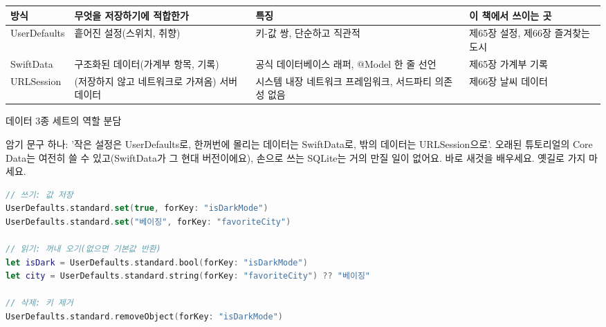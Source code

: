 


\begin{center}
\begin{tabularx}{\linewidth}{|X|X|X|X|}
\hline
\textbf{방식} & \textbf{무엇을 저장하기에 적합한가} & \textbf{특징} & \textbf{이 책에서 쓰이는 곳} \tabularnewline
\hline
UserDefaults & 흩어진 설정(스위치, 취향) & 키-값 쌍, 단순하고 직관적 & 제65장 설정, 제66장 즐겨찾는 도시 \tabularnewline
SwiftData & 구조화된 데이터(가계부 항목, 기록) & 공식 데이터베이스 래퍼, @Model 한 줄 선언 & 제65장 가계부 기록 \tabularnewline
URLSession & (저장하지 않고 네트워크로 가져옴) 서버 데이터 & 시스템 내장 네트워크 프레임워크, 서드파티 의존성 없음 & 제66장 날씨 데이터 \tabularnewline
\hline
\end{tabularx}
\end{center}

\begin{center}\small\color{gray}데이터 3종 세트의 역할 분담\end{center}

암기 문구 하나: '작은 설정은 UserDefaults로, 한꺼번에 몰리는 데이터는 SwiftData로, 밖의 데이터는 URLSession으로'. 오래된 튜토리얼의 Core Data는 여전히 쓸 수 있고(SwiftData가 그 현대 버전이에요), 손으로 쓰는 SQLite는 거의 만질 일이 없어요. 바로 새것을 배우세요. 옛길로 가지 마세요.


\begin{lstlisting}[language=Swift]
// 쓰기: 값 저장
UserDefaults.standard.set(true, forKey: "isDarkMode")
UserDefaults.standard.set("베이징", forKey: "favoriteCity")

// 읽기: 꺼내 오기(없으면 기본값 반환)
let isDark = UserDefaults.standard.bool(forKey: "isDarkMode")
let city = UserDefaults.standard.string(forKey: "favoriteCity") ?? "베이징"

// 삭제: 키 제거
UserDefaults.standard.removeObject(forKey: "isDarkMode")
\end{lstlisting}

